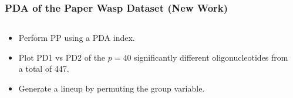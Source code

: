 \documentclass{beamer}
\begin{document}
\begin{frame}
	\frametitle{PDA of the Paper Wasp Dataset (New Work) }
	\begin{columns}
		\begin{column}{0.4\textwidth}
		  \begin{itemize}
			  \item Perform PP using a PDA index.
			\item Plot PD1 vs PD2 of the $p=40$ significantly different oligonucleotides from a total of 447.
			  \item Generate a lineup by permuting the group variable. 
		  \end{itemize}		
			
		\end{column}
		
		\begin{column}{0.6\textwidth}
			 \begin{center}  \end{center}
		\end{column}
	\end{columns}  

\end{frame}
\end{document}
